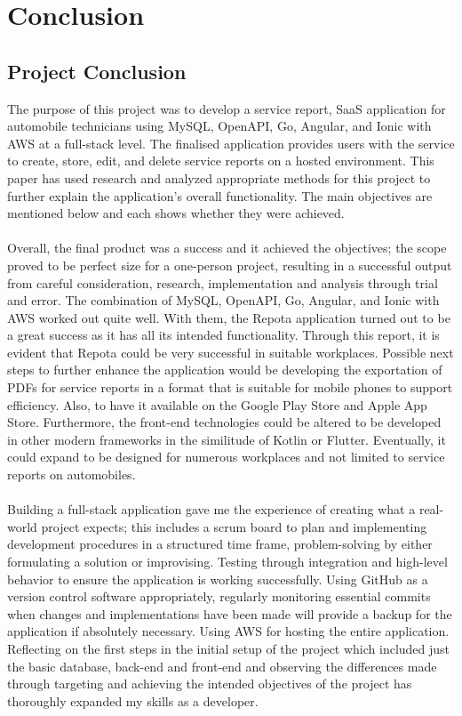 \chapter{Conclusion}

\section{Project Conclusion}
The purpose of this project was to develop a service report, SaaS application for automobile technicians using MySQL, OpenAPI, Go, Angular, and Ionic with AWS at a full-stack level. The finalised application provides users with the service to create, store, edit, and delete service reports on a hosted environment. This paper has used research and analyzed appropriate methods for this project to further explain the application's overall functionality. The main objectives are mentioned below and each shows whether they were achieved.
\\\\ Overall, the final product was a success and it achieved the objectives; the scope proved to be perfect size for a one-person project, resulting in a successful output from careful consideration, research, implementation and analysis through trial and error. The combination of MySQL, OpenAPI, Go, Angular, and Ionic with AWS worked out quite well. With them, the Repota application turned out to be a great success as it has all its intended functionality. Through this report, it is evident that Repota could be very successful in suitable workplaces. Possible next steps to further enhance the application would be developing the exportation of PDFs for service reports in a format that is suitable for mobile phones to support efficiency. Also, to have it available on the Google Play Store and Apple App Store. Furthermore, the front-end technologies could be altered to be developed in other modern frameworks in the similitude of Kotlin or Flutter. Eventually, it could expand to be designed for numerous workplaces and not limited to service reports on automobiles.
\\\\ Building a full-stack application gave me the experience of creating what a real-world project expects; this includes a scrum board to plan and implementing development procedures in a structured time frame, problem-solving by either formulating a solution or improvising. Testing through integration and high-level behavior to ensure the application is working successfully. Using GitHub as a version control software appropriately, regularly monitoring essential commits when changes and implementations have been made will provide a backup for the application if absolutely necessary. Using AWS for hosting the entire application. Reflecting on the first steps in the initial setup of the project which included just the basic database, back-end and front-end and observing the differences made through targeting and achieving the intended objectives of the project has thoroughly expanded my skills as a developer. 

